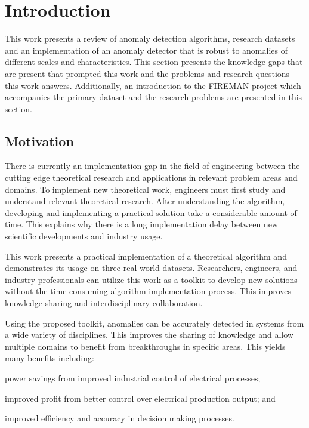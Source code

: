 \section{Introduction}
\label{ref_intro}

This work presents a review of anomaly detection algorithms, research datasets and an implementation of an anomaly detector that is robust to anomalies of different scales and characteristics. This section presents the knowledge gaps that are present that prompted this work and the problems and research questions this work answers. Additionally, an introduction to the FIREMAN project which accompanies the primary dataset and the research problems are presented in this section.

\subsection{Motivation}

There is currently an implementation gap in the field of engineering between the cutting edge theoretical research and applications in relevant problem areas and domains. To implement new theoretical work, engineers must first study and understand relevant theoretical research. After understanding the algorithm, developing and implementing a practical solution take a  considerable amount of time. This explains why there is a long implementation delay between new scientific developments and industry usage.

This work presents a practical implementation of a theoretical algorithm and demonstrates its usage on three real-world datasets. Researchers, engineers, and industry professionals can utilize this work as a toolkit to develop new solutions without the time-consuming algorithm implementation process. This improves knowledge sharing and interdisciplinary collaboration.

Using the proposed toolkit, anomalies can be accurately detected in systems from a wide variety of disciplines. This improves the sharing of knowledge and allow multiple domains to benefit from breakthroughs in specific areas. This yields many benefits including:
\begin{inlinelist}
  \item power savings from improved industrial control of electrical processes;
  \item improved profit from better control over electrical production output; and
  \item improved efficiency and accuracy in decision making processes.
\end{inlinelist}

